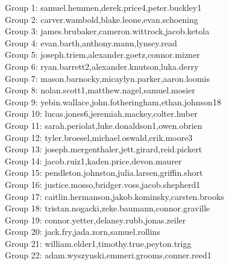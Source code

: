 \documentclass[10pt]{beamer}
\begin{document}
\begin{frame}
\footnotesize
Group 1: samuel.hemmen,derek.price4,peter.buckley1\\
Group 2: carver.wambold,blake.leone,evan.schoening\\
Group 3: james.brubaker,cameron.wittrock,jacob.ketola\\
Group 4: evan.barth,anthony.mann,lynsey.read\\
Group 5: joseph.triem,alexander.goetz,connor.mizner\\
Group 6: ryan.barrett2,alexander.knutson,luka.derry\\
Group 7: mason.barnocky,micaylyn.parker,aaron.loomis\\
Group 8: nolan.scott1,matthew.nagel,samuel.mosier\\
Group 9: yebin.wallace,john.fotheringham,ethan.johnson18\\
Group 10: lucas.jones6,jeremiah.mackey,colter.huber\\
Group 11: sarah.periolat,luke.donaldson1,owen.obrien\\
Group 12: tyler.broesel,michael.oswald,erik.moore3\\
Group 13: joseph.mergenthaler,jett.girard,reid.pickert\\
Group 14: jacob.ruiz1,kaden.price,devon.maurer\\
Group 15: pendleton.johnston,julia.larsen,griffin.short\\
Group 16: justice.mosso,bridger.voss,jacob.shepherd1\\
Group 17: caitlin.hermanson,jakob.kominsky,carsten.brooks\\
Group 18: tristan.nogacki,zeke.baumann,connor.graville\\
Group 19: connor.yetter,delaney.rubb,jonas.zeiler\\
Group 20: jack.fry,jada.zorn,samuel.rollins\\
Group 21: william.elder1,timothy.true,peyton.trigg\\
Group 22: adam.wyszynski,emmeri.grooms,conner.reed1
\end{frame}
\end{document}
